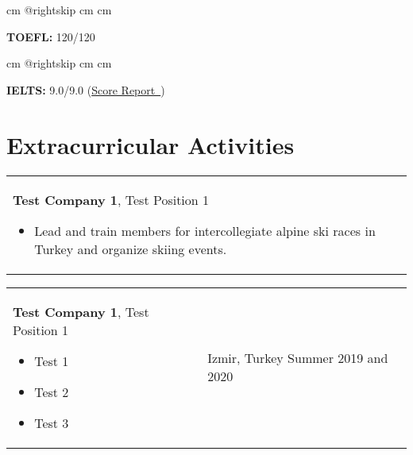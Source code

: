 \documentclass[10pt, a4paper]{article}
\newenvironment{highlights}{
        \begin{itemize}[
                topsep=0pt,
                parsep=0.07 cm,
                partopsep=0pt,
                itemsep=0pt,
                after=\vspace*{-1\baselineskip},
                leftmargin=0.6 cm + 3pt
            ]
    }{
        \end{itemize}
    } %
\let\hrefWithoutArrow\href
\renewcommand{\href}[2]{\hrefWithoutArrow{#1}{#2\, \raisebox{.1ex}{\footnotesize \faExternalLink*}}}
\begin{document}
            \begingroup\raggedright
             cm
            \advance\csname @rightskip cm
            \advance{} cm

            \textbf{TOEFL:} 120/120

            \par\endgroup

        \vspace*{0.12 cm}
        
            \begingroup\raggedright
             cm
            \advance\csname @rightskip cm
            \advance{} cm

            \textbf{IELTS:} 9.0/9.0 (\href{https://example.com/}{Score Report})

            \par\endgroup



    \section{Extracurricular Activities}
    
        \begin{tabularx}{ cm-0.13cm}{K{0.2 cm} R{3.6 cm}}
            \textbf{Test Company 1}, Test Position 1
            \vspace*{0.12 cm}
            \begin{highlights}
                \item Lead and train members for intercollegiate alpine ski races in Turkey and organize skiing events.
            \end{highlights}
        &
            \end{tabularx}

        \vspace*{0.12 cm}
        
        \begin{tabularx}{ cm-0.13cm}{K{0.2 cm} R{3.6 cm}}
            \textbf{Test Company 1}, Test Position 1
            \vspace*{0.12 cm}
            \begin{highlights}
                \item Test 1
                \item Test 2
                \item Test 3
            \end{highlights}
        &
            Izmir, Turkey \newline
            Summer 2019 and 2020
        \end{tabularx}
\end{document}

